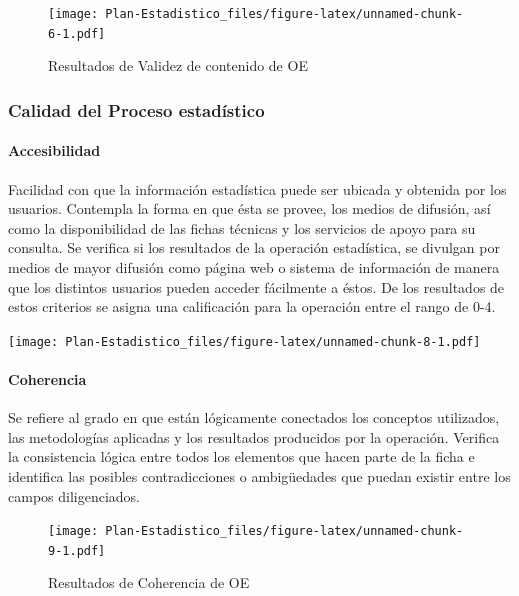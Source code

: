 \documentclass[
]{book}
\begin{document}
\begin{figure}
\centering
\texttt{[image: Plan-Estadistico\_files/figure-latex/unnamed-chunk-6-1.pdf]}
\caption{\label{fig:unnamed-chunk-6}Resultados de Validez de contenido de OE}
\end{figure}

\hypertarget{calidad-del-proceso-estaduxedstico}{%
\subsubsection{Calidad del Proceso estadístico}\label{calidad-del-proceso-estaduxedstico}}

\hypertarget{accesibilidad}{%
\paragraph{Accesibilidad}\label{accesibilidad}}

Facilidad con que la información estadística puede ser ubicada y obtenida por los usuarios. Contempla la forma en que ésta se provee, los medios de difusión, así como la disponibilidad de las fichas técnicas y los servicios de apoyo para su consulta. Se verifica si los
resultados de la operación estadística, se divulgan por medios de mayor difusión como página web o sistema de información de manera que los distintos usuarios pueden acceder fácilmente a éstos. De los resultados de estos criterios se asigna una calificación para la operación entre el rango de 0-4.

\texttt{[image: Plan-Estadistico\_files/figure-latex/unnamed-chunk-8-1.pdf]}

\hypertarget{coherencia}{%
\paragraph{Coherencia}\label{coherencia}}

Se refiere al grado en que están lógicamente conectados los conceptos utilizados, las metodologías aplicadas y los resultados producidos por la operación. Verifica la consistencia lógica entre todos los elementos que hacen parte de la ficha e identifica las posibles contradicciones o ambigüedades que puedan existir entre los campos diligenciados.

\begin{figure}
\centering
\texttt{[image: Plan-Estadistico\_files/figure-latex/unnamed-chunk-9-1.pdf]}
\caption{\label{fig:unnamed-chunk-9}Resultados de Coherencia de OE}
\end{figure}
\end{document}
